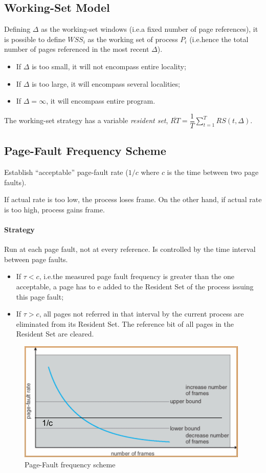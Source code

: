 \subsection{Working-Set Model}
Defining $\Delta$ as the working-set windows (i.e.\@ a fixed number of page references), it is possible to define ${WSS}_i$ as the working set of process $P_{i}$ (i.e.\@ hence the total number of pages referenced in the most recent $\Delta$).
\begin{itemize}
\item If $\Delta$ is too small, it will not encompass entire locality;
\item If $\Delta$ is too large, it will encompass several localities;
\item If $\Delta = \infty$, it will encompass entire program.
\end{itemize}
The working-set strategy has a variable \emph{resident set}, $\overline{RT} = \dfrac{1}{T} \sum_{t=1}^T RS(t,\Delta)$.

\subsection{Page-Fault Frequency Scheme}
Establish ``acceptable'' page-fault rate ($1/c$ where $c$ is the time between two page faults).

If actual rate is too low, the process loses frame. On the other hand, if actual rate is too high, process gains frame.

\paragraph{Strategy}
Run at each page fault, not at every reference. Is controlled by the time interval between page faults.
\begin{itemize}
\item If $\tau < c$, i.e.\@ the measured page fault frequency is greater than the one acceptable, a page has to e added to the Resident Set of the process issuing this page fault;
\item If $\tau > c$, all pages not referred in that interval by the current process are eliminated from its Resident Set. The reference bit of all pages in the Resident Set are cleared.
\end{itemize}

\begin{figure}[hbtp]
\centering
\includegraphics[scale=0.6]{images/virtual_memory/page_fault_frequency.jpg}
\caption{Page-Fault frequency scheme}
\end{figure}

